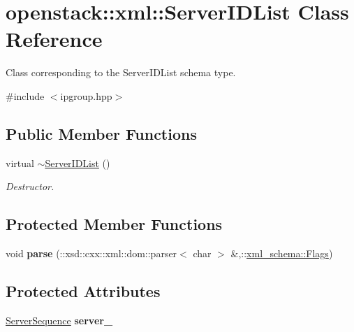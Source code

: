 \hypertarget{classopenstack_1_1xml_1_1ServerIDList}{
\section{openstack::xml::ServerIDList Class Reference}
\label{classopenstack_1_1xml_1_1ServerIDList}
}


Class corresponding to the ServerIDList schema type.  




{\ttfamily \#include $<$ipgroup.hpp$>$}

\subsection*{Public Member Functions}
\begin{DoxyCompactItemize}
\item 
\hypertarget{classopenstack_1_1xml_1_1ServerIDList_a72f1c5a7e68e5501d420db87cf1bfcbb}{
virtual \hyperlink{classopenstack_1_1xml_1_1ServerIDList_a72f1c5a7e68e5501d420db87cf1bfcbb}{$\sim$ServerIDList} ()}
\label{classopenstack_1_1xml_1_1ServerIDList_a72f1c5a7e68e5501d420db87cf1bfcbb}

\begin{DoxyCompactList}\small\item\em Destructor. \item\end{DoxyCompactList}\end{DoxyCompactItemize}
\subsection*{Protected Member Functions}
\begin{DoxyCompactItemize}
\item 
\hypertarget{classopenstack_1_1xml_1_1ServerIDList_aa97662bdb7810e95b3b47e631ff441e0}{
void {\bfseries parse} (::xsd::cxx::xml::dom::parser$<$ char $>$ \&,::\hyperlink{namespacexml__schema_affb4c227cbd9aa7453dd1dc5a1401943}{xml\_\-schema::Flags})}
\label{classopenstack_1_1xml_1_1ServerIDList_aa97662bdb7810e95b3b47e631ff441e0}

\end{DoxyCompactItemize}
\subsection*{Protected Attributes}
\begin{DoxyCompactItemize}
\item 
\hypertarget{classopenstack_1_1xml_1_1ServerIDList_a4ce72d541edda9d603919a4704d7aa9c}{
\hyperlink{classopenstack_1_1xml_1_1ServerIDList_a76966a1d164f92e19cbe3c2c573475e2}{ServerSequence} {\bfseries server\_\-}}
\label{classopenstack_1_1xml_1_1ServerIDList_a4ce72d541edda9d603919a4704d7aa9c}

\end{DoxyCompactItemize}
